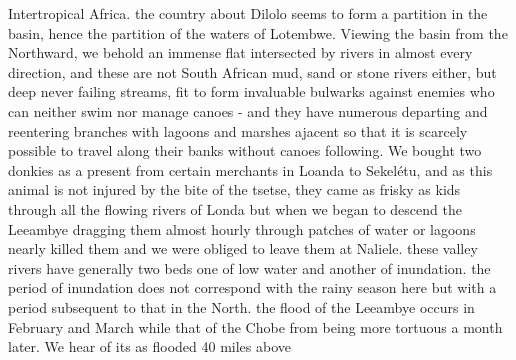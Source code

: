 \documentclass[11pt,twoside]{article}\makeatletter
\begin{document}
Intertropical Africa.  \newline the country about Dilolo seems to  \newline form a partition in the basin, hence  \newline the partition of the waters of Lotembwe. \newline  \indent Viewing the basin from the Northward,  \newline we behold an immense flat intersected  \newline by rivers in almost every direction, and  \newline these are not South African mud, sand {\newline \newline \noindent [0006]}  \newline or stone rivers either, but deep never failing  \newline streams, fit to form invaluable bulwarks  \newline against enemies who can neither swim  \newline nor manage canoes - and they have  \newline numerous departing and reentering branches  \newline with lagoons and marshes ajacent so  \newline that it is scarcely possible to travel  \newline along their banks without canoes following.  \newline We bought two donkies as a present from  \newline certain merchants in Loanda to Sekelétu,  \newline and as this animal is not injured by  \newline the bite of the tsetse, they came as frisky  \newline as kids through all the flowing rivers  \newline of Londa but when we began to descend  \newline the Leeambye dragging them almost hourly  \newline through patches of water or lagoons nearly  \newline killed them and we were obliged to leave them at Naliele. these valley rivers  \newline have generally two beds one of low water  \newline and another of inundation. the period  \newline of inundation does not correspond with  \newline the rainy season here but with a period  \newline subsequent to that in the North. the  \newline flood of the Leeambye occurs in February  \newline and March while that of the Chobe from {\newline \newline \noindent [0007]}  \newline being more tortuous a month later. We hear of  \newline its as flooded 40 miles above 
\end{document}
